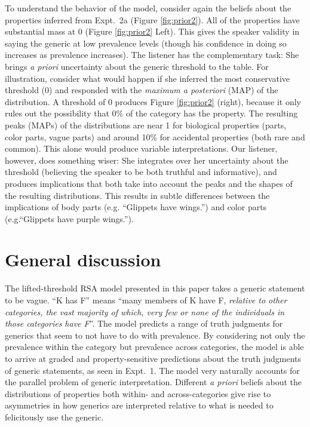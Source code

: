 \documentclass[10pt,letterpaper]{article}
\begin{document}
To understand the behavior of the model, consider again the beliefs about the properties inferred from Expt.~2a (Figure \ref{fig:prior2}). 
All of the properties have substantial mass at 0 (Figure \ref{fig:prior2} Left). 
This gives the speaker validity in saying the generic at low prevalence levels (though his confidence in doing so increases as prevalence increases).
The listener has the complementary task: She brings \emph{a priori} uncertainty about the generic threshold to the table.
For illustration, consider what would happen if she inferred the most conservative threshold (0) and responded with the \emph{maximum a posteriori} (MAP) of the distribution. 
A threshold of 0 produces Figure \ref{fig:prior2} (right), because it only rules out the possibility that 0\% of the category has the property. 
The resulting peaks (MAPs) of the distributions are near 1 for biological properties (parts, color parts, vague parts) and around 10\% for accidental properties (both rare and common). This alone would produce variable interpretations. 
Our listener, however, does something wiser: She integrates over her uncertainty about the threshold (believing the speaker to be both truthful and informative), and produces implications that both take into account the peaks and the shapes of the resulting distributions.
This results in subtle differences between the implications of body parts (e.g. ``Glippets have wings.'') and  color parts (e.g.``Glippets have purple wings.''). 



\section{General discussion}

The lifted-threshold RSA model presented in this paper takes a generic statement to be vague. ``K has F'' means ``many members of K have F, \emph{relative to other categories, the vast majority of which, very few or none of the individuals in those categories have F}''. 
The model predicts a range of truth judgments for generics that seem to not have to do with prevalence. 
By considering not only the prevalence within the category but prevalence across categories, the model is able to arrive at graded and property-sensitive predictions about the truth judgments of generic statements, as seen in Expt.~1. 
The model very naturally accounts for the parallel problem of generic interpretation. 
Different \emph{a priori} beliefs about the distributions of properties both within- and across-categories give rise to asymmetries in how generics are interpreted relative to what is needed to felicitously use the generic. 
\end{document}
